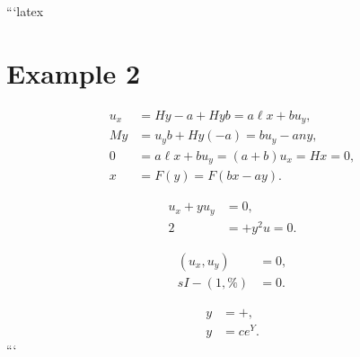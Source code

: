 ```latex
\section*{Example 2}

\begin{align}
    u_x &= Hy - a + Hyb = a \ell x + b u_y, \\
    My &= u_y b + Hy(-a) = b u_y - a n y, \\
    0 &= a \ell x + b u_y = (a + b) u_x = Hx = 0, \\
    x &= F(y) = F(bx - ay).
\end{align}

\begin{align}
    u_x + y u_y &= 0, \\
    2 &= + y^2 u = 0.
\end{align}

\begin{align}
    (u_x, u_y) &= 0, \\
    s I - (1, \%) &= 0.
\end{align}

\begin{align}
    y &= +, \\
    y &= c e^Y.
\end{align}
```
